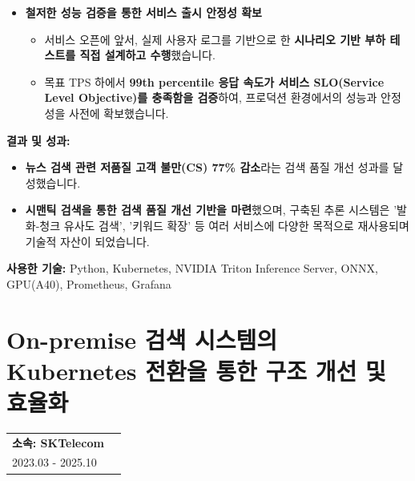 \documentclass[letterpaper,11pt]{article}
\makeatletter
\newcommand{\resumeProject}[2]{
  \vspace{-1pt}\item
    \begin{tabular*}{0.97\textwidth}[t]{l@{\extracolsep{\fill}}r}
      \textbf{#1} \\
      \small{#2} \\
    \end{tabular*}\vspace{-5pt}
}
\makeatother
\begin{document}
{\begin{itemize}[leftmargin=*]
          \item \textbf{철저한 성능 검증을 통한 서비스 출시 안정성 확보}
              \begin{itemize}[leftmargin=*, label=$\circ$]
                  \item 서비스 오픈에 앞서, 실제 사용자 로그를 기반으로 한 \textbf{시나리오 기반 부하 테스트를 직접 설계하고 수행}했습니다.
                  \item 목표 TPS 하에서 \textbf{99th percentile 응답 속도가 서비스 SLO(Service Level Objective)를 충족함을 검증}하여, 프로덕션 환경에서의 성능과 안정성을 사전에 확보했습니다.
              \end{itemize}
      \end{itemize}

      \textbf{결과 및 성과:}
      \begin{itemize}[leftmargin=*]
          \item \textbf{뉴스 검색 관련 저품질 고객 불만(CS) 77\% 감소}라는 검색 품질 개선 성과를 달성했습니다.
          \item \textbf{시맨틱 검색을 통한 검색 품질 개선 기반을 마련}했으며, 구축된 추론 시스템은 '발화-청크 유사도 검색', '키워드 확장' 등 여러 서비스에 다양한 목적으로 재사용되며 기술적 자산이 되었습니다.
      \end{itemize}

      \textbf{사용한 기술:} Python, Kubernetes, NVIDIA Triton Inference Server, ONNX, GPU(A40), Prometheus, Grafana
    }

    \resumeProjectListEnd

  \section{\textbf{On-premise 검색 시스템의 Kubernetes 전환을 통한 구조 개선 및 효율화}}
    \resumeProjectListStart
      \resumeProject
      {\textbf{소속}: SKTelecom} {2023.03 - 2025.10}
      
\end{document}
